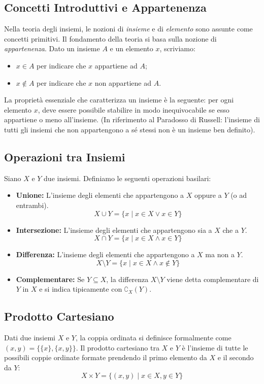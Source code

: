 \documentclass[12pt, a4paper]{article}
\begin{document}
\subsection{Concetti Introduttivi e Appartenenza}
Nella teoria degli insiemi, le nozioni di \emph{insieme} e di \emph{elemento} sono assunte come concetti primitivi. Il fondamento della teoria si basa sulla nozione di \emph{appartenenza}.
Dato un insieme $A$ e un elemento $x$, scriviamo:
\begin{itemize}
    \item $x \in A$ per indicare che $x$ appartiene ad $A$;
    \item $x \notin A$ per indicare che $x$ non appartiene ad $A$.
\end{itemize}
La proprietà essenziale che caratterizza un insieme è la seguente: per ogni elemento $x$, deve essere possibile stabilire in modo inequivocabile se esso appartiene o meno all'insieme. (In riferimento al Paradosso di Russell: l'insieme di tutti gli insiemi che non appartengono a sé stessi non è un insieme ben definito).

\subsection{Operazioni tra Insiemi}
Siano $X$ e $Y$ due insiemi. Definiamo le seguenti operazioni basilari:
\begin{itemize}
    \item \textbf{Unione:} L'insieme degli elementi che appartengono a $X$ oppure a $Y$ (o ad entrambi).
    \[ X \cup Y = \{x \mid x \in X \lor x \in Y\} \]
    \item \textbf{Intersezione:} L'insieme degli elementi che appartengono sia a $X$ che a $Y$.
    \[ X \cap Y = \{x \mid x \in X \land x \in Y\} \]
    \item \textbf{Differenza:} L'insieme degli elementi che appartengono a $X$ ma non a $Y$.
    \[ X \setminus Y = \{x \mid x \in X \land x \notin Y\} \]
    \item \textbf{Complementare:} Se $Y \subseteq X$, la differenza $X \setminus Y$ viene detta complementare di $Y$ in $X$ e si indica tipicamente con $\complement_X(Y)$.
\end{itemize}

\subsection{Prodotto Cartesiano}
Dati due insiemi $X$ e $Y$, la coppia ordinata si definisce formalmente come $(x, y) = \{\{x\}, \{x, y\}\}$. Il prodotto cartesiano tra $X$ e $Y$ è l'insieme di tutte le possibili coppie ordinate formate prendendo il primo elemento da $X$ e il secondo da $Y$:
\[ X \times Y = \{(x, y) \mid x \in X, y \in Y\} \]
\end{document}
